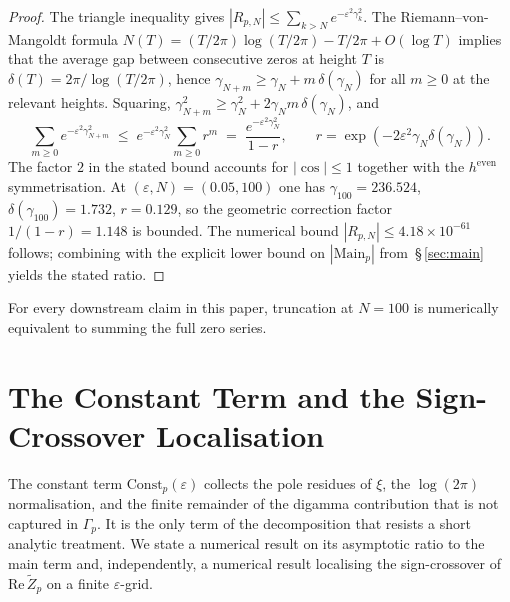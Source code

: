 \documentclass[11pt]{article}
\newcommand{\Zt}{\widetilde{Z}}
\begin{document}
\begin{proof}
The triangle inequality gives
$|R_{p,N}|\le\sum_{k>N} e^{-\varepsilon^2\gamma_k^2}$. The Riemann--von-Mangoldt
formula $N(T)=(T/2\pi)\log(T/2\pi)-T/2\pi+O(\log T)$ implies that the
average gap between consecutive zeros at height $T$ is
$\delta(T)=2\pi/\log(T/2\pi)$, hence
$\gamma_{N+m}\ge\gamma_N+m\,\delta(\gamma_N)$ for all $m\ge 0$ at the
relevant heights. Squaring,
$\gamma_{N+m}^2\ge\gamma_N^2+2\gamma_N m\,\delta(\gamma_N)$, and
\[
\sum_{m\ge 0} e^{-\varepsilon^2\gamma_{N+m}^2}
\;\le\; e^{-\varepsilon^2\gamma_N^2}\sum_{m\ge 0} r^m
\;=\; \frac{e^{-\varepsilon^2\gamma_N^2}}{1-r},
\qquad r=\exp(-2\varepsilon^2\gamma_N\delta(\gamma_N)).
\]
The factor $2$ in the stated bound accounts for $|\cos|\le 1$ together
with the $h^{\mathrm{even}}$ symmetrisation. At
$(\varepsilon,N)=(0.05,100)$ one has $\gamma_{100}=236.524$,
$\delta(\gamma_{100})=1.732$, $r=0.129$, so the geometric correction
factor $1/(1-r)=1.148$ is bounded. The numerical bound
$|R_{p,N}|\le 4.18\times 10^{-61}$ follows; combining with the explicit
lower bound on $|\mathrm{Main}_p|$ from~\S\,\ref{sec:main} yields the
stated ratio.
\end{proof}

For every downstream claim in this paper, truncation at $N=100$ is
numerically equivalent to summing the full zero series.

\section{The Constant Term and the Sign-Crossover Localisation}
\label{sec:const}

The constant term $\mathrm{Const}_p(\varepsilon)$ collects the pole
residues of $\xi$, the $\log(2\pi)$ normalisation, and the finite
remainder of the digamma contribution that is not captured in
$\Gamma_p$.
It is the only term of the decomposition that resists a short analytic
treatment.
We state a numerical result on its asymptotic ratio to the main term
and, independently, a numerical result localising the sign-crossover
of $\mathrm{Re}\,\Zt_p$ on a finite $\varepsilon$-grid.
\end{document}
